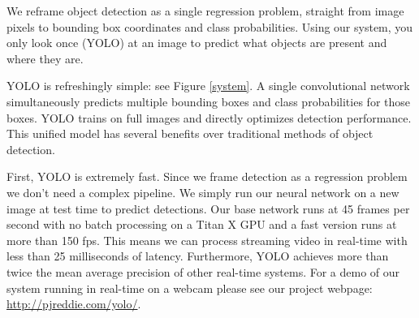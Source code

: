 \documentclass[10pt,twocolumn,letterpaper]{article}
\begin{document}


We reframe object detection as a single regression problem, straight from image pixels to bounding box coordinates and class probabilities. Using our system, you only look once (YOLO) at an image to predict what objects are present and where they are.

YOLO is refreshingly simple: see Figure \ref{system}. A single convolutional network simultaneously predicts multiple bounding boxes and class probabilities for those boxes. YOLO trains on full images and directly optimizes detection performance. This unified model has several benefits over traditional methods of object detection.

First, YOLO is extremely fast. Since we frame detection as a regression problem we don't need a complex pipeline. We simply run our neural network on a new image at test time to predict detections. Our base network runs at 45 frames per second with no batch processing on a Titan X GPU and a fast version runs at more than 150 fps. This means we can process streaming video in real-time with less than 25 milliseconds of latency. Furthermore, YOLO achieves more than twice the mean average precision of other real-time systems. For a demo of our system running in real-time on a webcam please see our project webpage: \url{http://pjreddie.com/yolo/}.
\end{document}
